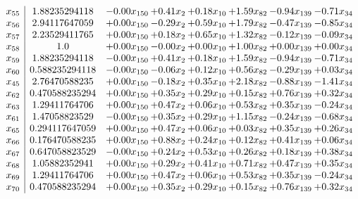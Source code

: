 \documentclass[8pt]{article}
\begin{document}
\[\begin{array}{c| c c@{\hskip 2pt} c@{\hskip 2pt} c@{\hskip 2pt} c@{\hskip 2pt} c@{\hskip 2pt} c@{\hskip 2pt} }
 x_{55}   &  1.88235294118 & -0.00 x_{150} & +  0.41 x_{2} & +  0.18 x_{10} & +  1.59 x_{82} & -0.94 x_{139} & -0.71 x_{34}\\
 x_{56}   &  2.94117647059 & +  0.00 x_{150} & -0.29 x_{2} & +  0.59 x_{10} & +  1.79 x_{82} & -0.47 x_{139} & -0.85 x_{34}\\
 x_{57}   &  2.23529411765 & +  0.00 x_{150} & +  0.18 x_{2} & +  0.65 x_{10} & +  1.32 x_{82} & -0.12 x_{139} & -0.09 x_{34}\\
 x_{58}   &  1.0 & +  0.00 x_{150} & -0.00 x_{2} & +  0.00 x_{10} & +  1.00 x_{82} & +  0.00 x_{139} & +  0.00 x_{34}\\
 x_{59}   &  1.88235294118 & -0.00 x_{150} & +  0.41 x_{2} & +  0.18 x_{10} & +  1.59 x_{82} & -0.94 x_{139} & -0.71 x_{34}\\
 x_{60}   &  0.588235294118 & -0.00 x_{150} & -0.06 x_{2} & +  0.12 x_{10} & +  0.56 x_{82} & -0.29 x_{139} & +  0.03 x_{34}\\
 x_{45}   &  2.76470588235 & +  0.00 x_{150} & -0.18 x_{2} & +  0.35 x_{10} & +  2.18 x_{82} & -0.88 x_{139} & -1.41 x_{34}\\
 x_{62}   &  0.470588235294 & +  0.00 x_{150} & +  0.35 x_{2} & +  0.29 x_{10} & +  0.15 x_{82} & +  0.76 x_{139} & +  0.32 x_{34}\\
 x_{63}   &  1.29411764706 & +  0.00 x_{150} & +  0.47 x_{2} & +  0.06 x_{10} & +  0.53 x_{82} & +  0.35 x_{139} & -0.24 x_{34}\\
 x_{61}   &  1.47058823529 & -0.00 x_{150} & +  0.35 x_{2} & +  0.29 x_{10} & +  1.15 x_{82} & -0.24 x_{139} & -0.68 x_{34}\\
 x_{65}   &  0.294117647059 & +  0.00 x_{150} & +  0.47 x_{2} & +  0.06 x_{10} & +  0.03 x_{82} & +  0.35 x_{139} & +  0.26 x_{34}\\
 x_{66}   &  0.176470588235 & +  0.00 x_{150} & +  0.88 x_{2} & +  0.24 x_{10} & +  0.12 x_{82} & +  0.41 x_{139} & +  0.06 x_{34}\\
 x_{67}   &  0.647058823529 & -0.00 x_{150} & +  0.24 x_{2} & +  0.53 x_{10} & +  0.26 x_{82} & +  0.18 x_{139} & +  0.38 x_{34}\\
 x_{68}   &  1.05882352941 & +  0.00 x_{150} & +  0.29 x_{2} & +  0.41 x_{10} & +  0.71 x_{82} & +  0.47 x_{139} & +  0.35 x_{34}\\
 x_{69}   &  1.29411764706 & +  0.00 x_{150} & +  0.47 x_{2} & +  0.06 x_{10} & +  0.53 x_{82} & +  0.35 x_{139} & -0.24 x_{34}\\
 x_{70}   &  0.470588235294 & +  0.00 x_{150} & +  0.35 x_{2} & +  0.29 x_{10} & +  0.15 x_{82} & +  0.76 x_{139} & +  0.32 x_{34}\\

\end{array}\]
\end{document}
